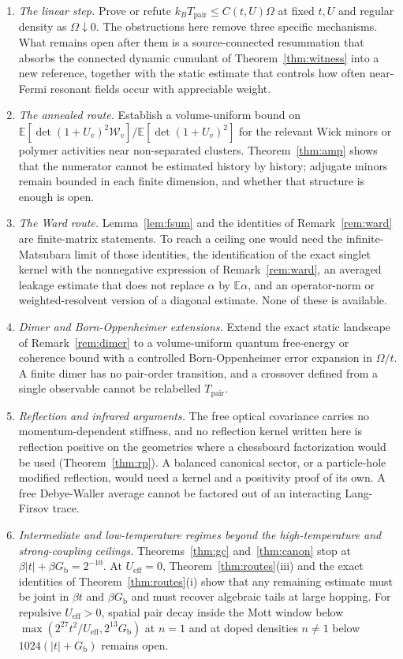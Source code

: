 \documentclass[11pt]{article}
\theoremstyle{definition}
\theoremstyle{remark}
\newcommand{\E}{\mathbb{E}}
\newcommand{\eff}{\mathrm{eff}}
\newcommand{\pair}{\mathrm{pair}}
\newcommand{\Tpair}{T_{\pair}}
\newcommand{\Gb}{G_{\mathrm{b}}}
\newcommand{\Ueff}{U_{\eff}}
\begin{document}
\begin{enumerate}[label=(\arabic*),leftmargin=2.2em]
\item \emph{The linear step.} Prove or refute
$k_B\Tpair\le C(t,U)\Omega$ at fixed $t,U$ and regular density as
$\Omega\downarrow0$. The obstructions here remove three specific mechanisms. What
remains open after them is a source-connected resummation that absorbs the connected
dynamic cumulant of Theorem~\ref{thm:witness} into a new reference, together with the
static estimate that controls how often near-Fermi resonant fields occur with
appreciable weight.
\item \emph{The annealed route.} Establish a volume-uniform bound on
$\E[\det(1+U_v)^2\mathcal{W}_v]/\E[\det(1+U_v)^2]$ for the relevant Wick minors or
polymer activities near non-separated clusters. Theorem~\ref{thm:amp} shows that the
numerator cannot be estimated history by history; adjugate minors remain bounded in
each finite dimension, and whether that structure is enough is open.
\item \emph{The Ward route.} Lemma~\ref{lem:fsum} and the identities of
Remark~\ref{rem:ward} are finite-matrix statements. To reach a ceiling one would need
the infinite-Matsubara limit of those identities, the identification of the exact
singlet kernel with the nonnegative expression of
Remark~\ref{rem:ward}, an averaged leakage estimate that does not replace $\alpha$ by
$\E\alpha$, and an operator-norm or weighted-resolvent version of a diagonal estimate.
None of these is available.
\item \emph{Dimer and Born-Oppenheimer extensions.} Extend the exact static landscape
of Remark~\ref{rem:dimer} to a volume-uniform quantum free-energy or coherence bound
with a controlled Born-Oppenheimer error expansion in $\Omega/t$. A finite dimer has no
pair-order transition, and a crossover defined from a single observable cannot be
relabelled $\Tpair$.
\item \emph{Reflection and infrared arguments.} The free optical covariance carries no
momentum-dependent stiffness, and no reflection kernel written here is reflection
positive on the geometries where a chessboard factorization would be used
(Theorem~\ref{thm:rp}). A balanced canonical sector, or a particle-hole modified
reflection, would need a kernel and a positivity proof of its own. A free Debye-Waller average cannot be factored
out of an interacting Lang-Firsov trace.
\item \emph{Intermediate and low-temperature regimes beyond the high-temperature and
strong-coupling ceilings.} Theorems~\ref{thm:gc} and~\ref{thm:canon} stop at
$\beta|t|+\beta\Gb=2^{-10}$. At $\Ueff=0$, Theorem~\ref{thm:routes}(iii) and the
exact identities of Theorem~\ref{thm:routes}(i) show that any remaining estimate
must be joint in $\beta t$ and $\beta\Gb$ and must recover algebraic tails at large
hopping. For repulsive $\Ueff>0$, spatial pair decay inside the Mott window below
$\max(2^{27}t^2/\Ueff,2^{13}\Gb)$ at $n=1$ and at doped densities $n\ne1$ below
$1024(|t|+\Gb)$ remains open.
\end{enumerate}
\end{document}
